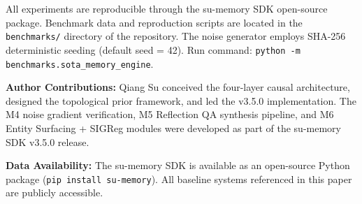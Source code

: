 \documentclass[11pt,a4paper]{article}
\begin{document}
All experiments are reproducible through the su-memory SDK open-source package. Benchmark data and reproduction scripts are located in the \texttt{benchmarks/} directory of the repository. The noise generator employs SHA-256 deterministic seeding (default seed = 42). Run command: \texttt{python -m benchmarks.sota\_memory\_engine}.

\vspace{10pt}
\noindent\textbf{Author Contributions:} Qiang Su conceived the four-layer causal architecture, designed the topological prior framework, and led the v3.5.0 implementation. The M4 noise gradient verification, M5 Reflection QA synthesis pipeline, and M6 Entity Surfacing + SIGReg modules were developed as part of the su-memory SDK v3.5.0 release.

\noindent\textbf{Data Availability:} The su-memory SDK is available as an open-source Python package (\texttt{pip install su-memory}). All baseline systems referenced in this paper are publicly accessible.

\vspace{10pt}
\end{document}
